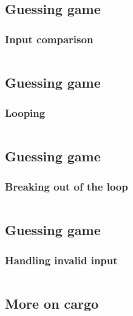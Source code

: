 \documentclass[usenames,twocolumn,dvipsnames,10pt,a4wide]{article}
\begin{document}
\subsection{Guessing game}
	\subsubsection{Input comparison}
	\inputminted[fontsize=\normalsize]{rust}{code/guess4.rs}



\subsection{Guessing game}
	\subsubsection{Looping}
	\inputminted[fontsize=\normalsize]{rust}{code/guess5.rs}


\subsection{Guessing game}
	\subsubsection{Breaking out of the loop}
	\inputminted[fontsize=\normalsize]{rust}{code/guess6.rs}


\subsection{Guessing game}
	\subsubsection{Handling invalid input}
	\inputminted[fontsize=\normalsize]{rust}{code/guess7.rs}


\subsection{More on cargo}
	\inputminted[fontsize=\normalsize]{shell}{code/cargo.sh}
\end{document}
